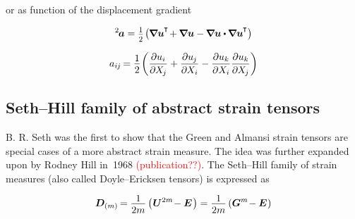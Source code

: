 \vspace{-0.4em} \noindent or as function of the displacement gradient

\nopagebreak\begin{equation*}
{^2\hspace{-0.2ex}\bm{a}} = \smalldisplaystyleonehalf \hspace{-0.2ex} \left( \hspace{-0.1ex}
\boldnabla\bm{u}^{\hspace{-0.1ex}\T} \hspace{-0.3ex}
+ \hspace{-0.1ex} \boldnabla\bm{u}
- \hspace{-0.1ex} \boldnabla\bm{u} \dotp \hspace{-0.1ex} \boldnabla\bm{u}^{\hspace{-0.1ex}\T}
\right)
\end{equation*}

\nopagebreak\vspace{-0.2em}\begin{equation*}
\displaystyle a_{i\hspace{-0.1ex}j} \hspace{-0.2ex} = \onehalf \hspace{-0.25ex} \left(
\frac{\partial u_{i}}{\partial \hspace{-0.1ex} X_{\hspace{-0.15ex}j}}
+ \frac{\partial u_{\hspace{-0.1ex}j}}{\partial \hspace{-0.1ex} X_{i}}
- \frac{\partial u_{k}}{\partial X_{i}} \frac{\partial u_{k}}{\partial \hspace{-0.1ex} X_{\hspace{-0.15ex}j}}
\right)
\end{equation*}

\subsection*{Seth\hbox{--}Hill family of abstract strain tensors}

B. R. Seth was the first to show that the Green and Almansi strain tensors are special cases of a more abstract strain measure. The idea was further expanded upon by Rodney Hill in~1968 \textcolor{red}{(publication??)}. The Seth\hbox{--}Hill family of strain measures (also called Doyle\hbox{--}Ericksen tensors) is expressed as

\nopagebreak\vspace{-0.1em}\begin{equation*}
\displaystyle \bm{D}_{(m)} \hspace{-0.2ex}
= \frac{\raisebox{-0.2em}{1}}{2m} \left( \hspace{.1ex} \bm{U}^{2m} \hspace{-0.4ex} - \bm{E} \hspace{.2ex} \right)
= \frac{\raisebox{-0.2em}{1}}{2m} \left( \bm{G}^{m} \hspace{-0.4ex} - \bm{E} \hspace{.1ex} \right) \end{equation*}

